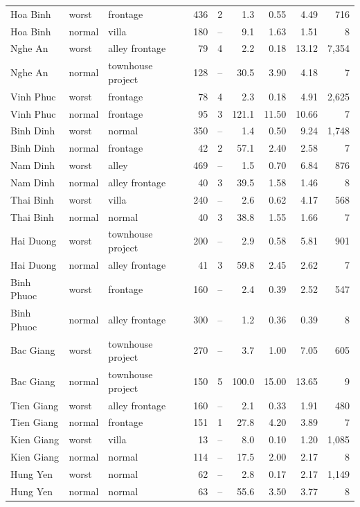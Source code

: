{\begin{longtable}{lllrrrrrr}
Hoa Binh & worst & frontage & 436 & 2 & 1.3 & 0.55 & 4.49 & 716 \\
Hoa Binh & normal & villa & 180 & -- & 9.1 & 1.63 & 1.51 & 8 \\
Nghe An & worst & alley frontage & 79 & 4 & 2.2 & 0.18 & 13.12 & 7,354 \\
Nghe An & normal & townhouse project & 128 & -- & 30.5 & 3.90 & 4.18 & 7 \\
Vinh Phuc & worst & frontage & 78 & 4 & 2.3 & 0.18 & 4.91 & 2,625 \\
Vinh Phuc & normal & frontage & 95 & 3 & 121.1 & 11.50 & 10.66 & 7 \\
Binh Dinh & worst & normal & 350 & -- & 1.4 & 0.50 & 9.24 & 1,748 \\
Binh Dinh & normal & frontage & 42 & 2 & 57.1 & 2.40 & 2.58 & 7 \\
Nam Dinh & worst & alley & 469 & -- & 1.5 & 0.70 & 6.84 & 876 \\
Nam Dinh & normal & alley frontage & 40 & 3 & 39.5 & 1.58 & 1.46 & 8 \\
Thai Binh & worst & villa & 240 & -- & 2.6 & 0.62 & 4.17 & 568 \\
Thai Binh & normal & normal & 40 & 3 & 38.8 & 1.55 & 1.66 & 7 \\
Hai Duong & worst & townhouse project & 200 & -- & 2.9 & 0.58 & 5.81 & 901 \\
Hai Duong & normal & alley frontage & 41 & 3 & 59.8 & 2.45 & 2.62 & 7 \\
Binh Phuoc & worst & frontage & 160 & -- & 2.4 & 0.39 & 2.52 & 547 \\
Binh Phuoc & normal & alley frontage & 300 & -- & 1.2 & 0.36 & 0.39 & 8 \\
Bac Giang & worst & townhouse project & 270 & -- & 3.7 & 1.00 & 7.05 & 605 \\
Bac Giang & normal & townhouse project & 150 & 5 & 100.0 & 15.00 & 13.65 & 9 \\
Tien Giang & worst & alley frontage & 160 & -- & 2.1 & 0.33 & 1.91 & 480 \\
Tien Giang & normal & frontage & 151 & 1 & 27.8 & 4.20 & 3.89 & 7 \\
Kien Giang & worst & villa & 13 & -- & 8.0 & 0.10 & 1.20 & 1,085 \\
Kien Giang & normal & normal & 114 & -- & 17.5 & 2.00 & 2.17 & 8 \\
Hung Yen & worst & normal & 62 & -- & 2.8 & 0.17 & 2.17 & 1,149 \\
Hung Yen & normal & normal & 63 & -- & 55.6 & 3.50 & 3.77 & 8 \\

\end{longtable}}
